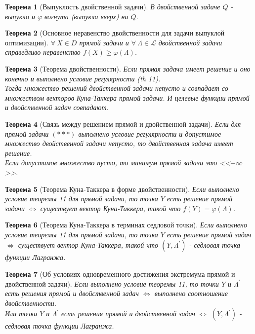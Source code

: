 \documentclass[12pt]{article}
\newtheorem{theorem}{Теорема}[section]
\theoremstyle{definition}
\theoremstyle{remark}
\begin{document}
\begin{theorem}[Выпуклость двойственной задачи]
  В двойственной задаче $Q$ - выпукло и $\varphi$ вогнута (выпукла вверх) на $Q$.
\end{theorem}

\begin{theorem}[Основное неравенство двойственности для задачи выпуклой оптимизации]
  $\forall\:X\in D$ прямой задачи и $\forall\:\Lambda\in \mathcal{L}$ двойственной задачи справедливо неравенство $f(X)\geqslant \varphi(\Lambda)$.
\end{theorem}

\begin{theorem}[Теорема двойственности]
  Если прямая задача имеет решение и оно конечно и выполнено условие регулярности (th 11).\\
  Тогда множество решений двойственной задачи непусто и совпадает со множеством векторов Куна-Таккера прямой задачи. И целевые функции прямой и двойственной задач совпадают.
\end{theorem}

\begin{theorem}[Связь между решением прямой и двойственной задачи]
  Если для прямой задачи $(***)$ выполнено условие регулярности и допустимое множество двойственной задачи непусто, то двойственная задача имеет решение.\\ Если допустимое множество пусто, то минимум прямой задачи это <<$-\infty $>>.
\end{theorem}

\begin{theorem}[Теорема Куна-Таккера в форме двойственности]
  Если выполнено условие теоремы 11 для прямой задачи, то точка $Y$ есть решение прямой задачи $\iff$ существует вектор Куна-Таккера, такой что $f(Y)=\varphi(\Lambda)$.
\end{theorem}

\begin{theorem}[Теорема Куна-Таккера в терминах седловой точки]
  Если выполнено условие теоремы 11 для прямой задачи, то точка $Y$ есть решение прямой задач $\iff$ существует вектор Куна-Таккера, такой что $(Y,\Lambda^{'})$ - седловая точка функции Лагранжа.
\end{theorem}

\begin{theorem}[Об условиях одновременного достижения экстремума прямой и двойственной задачи]
  Если выполнено условие теоремы 11, то точки $Y$ и $\Lambda^{'}$ есть решения прямой и двойственной задач $\iff$ выполнено соотношение двойственности.\\ Или точки $Y$ и $\Lambda^{'}$ есть решения прямой и двойственной задач $\iff$ $(Y,\Lambda^{'})$ - седловая точка функции Лагранжа.
\end{theorem}
\end{document}
